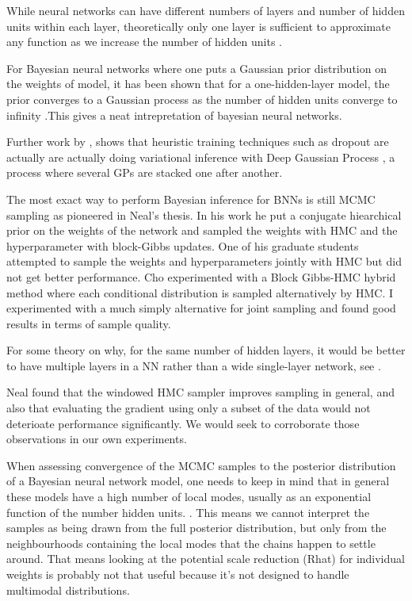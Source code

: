 \documentclass[]{report}
\begin{document}
While neural networks can have different numbers of layers and number of hidden
units within each layer, theoretically only one layer is sufficient to
approximate any function as we increase the number of hidden units \cite{hornik1991approximation}. 

For Bayesian neural networks where one puts a Gaussian prior distribution on the weights of model, it has been shown that for a one-hidden-layer model, the prior converges to a Gaussian process as the number of hidden units converge to infinity \cite{neal2012bayesian}.This gives a neat intrepretation of bayesian neural networks. 

Further work by \cite{gal2015dropout}, shows that heuristic training techniques such as dropout are actually are actually doing variational inference with Deep Gaussian Process \cite{damianou2013deep}, a process where several GPs are stacked one after another. 

The most exact way to perform Bayesian inference for BNNs is still MCMC sampling as pioneered in Neal's thesis. In his work he put a conjugate hiearchical prior on the weights of the network and sampled the weights with HMC and the hyperparameter with block-Gibbs updates. One of his graduate students attempted to sample the weights and hyperparameters jointly with HMC but did not get better performance. Cho experimented with a Block Gibbs-HMC hybrid method where each conditional distribution is sampled alternatively by HMC. I experimented with a much simply alternative for joint sampling and found good results in terms of sample quality. 

For some theory on why, for the same number of hidden layers, it would be better to have multiple layers in a NN rather than a wide single-layer network, see \cite{montufar2014number}. 

Neal found that the windowed HMC sampler improves sampling in general, and also that evaluating the gradient using only a subset of the data would not deterioate performance significantly. We would seek to corroborate those observations in our own experiments.

When assessing convergence of the MCMC samples to the posterior distribution of a Bayesian neural network model, one needs to keep in mind that in general these models have a high number of local modes, usually as an exponential function of the number hidden units. \cite{bishop1995neural}. This means we cannot interpret the samples as being drawn from the full posterior distribution, but only from the neighbourhoods containing the local modes that the chains happen to settle around. That means looking at the potential scale reduction (Rhat) for individual weights is probably not that useful because it's not designed to handle multimodal distributions.  
\end{document}
